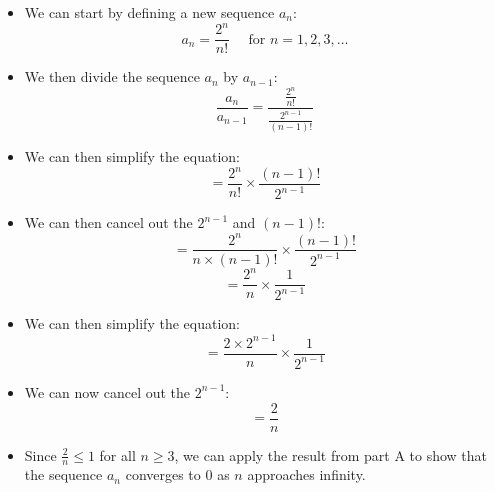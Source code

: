 \documentclass[12pt]{report}
\begin{document}
\begin{enumerate}[leftmargin=\labelsep]
\begin{enumerate}
\begin{tcolorbox}
\begin{itemize}[label={}]
                        \item We can start by defining a new sequence $a_n$:
                        \begin{equation*}
                            a_n = \frac{2^n}{n!} \quad \text{ for } n=1,2,3,\dots
                        \end{equation*}
                        \item We then divide the sequence $a_n$ by $a_{n-1}$:
                        \begin{equation*} \frac{a_n}{a_{n-1}} = \frac{\frac{2^n}{n!}}{\frac{2^{n-1}}{(n-1)!}}
                        \end{equation*}
                        \item We can then simplify the equation:
                        \begin{equation*}
                           = \frac{2^n}{n!} \times \frac{(n-1)!}{2^{n-1}}
                        \end{equation*}
                        \item We can then cancel out the $2^{n-1}$ and $(n-1)!$:
                        \begin{equation*}
                            = \frac{2^n}{n \times (n-1)!} \times \frac{(n-1)!}{2^{n-1}}
                        \end{equation*}
                        \begin{equation*}
                            =\frac{2^n}{n} \times \frac{1}{2^{n-1}}
                        \end{equation*}
                        \item We can then simplify the equation:
                        \begin{equation*}
                            =\frac{2 \times 2^{n-1}}{n} \times \frac{1}{2^{n-1}}
                        \end{equation*}
                        \item We can now cancel out the $2^{n-1}$:
                        \begin{equation*}
                            =\frac{2}{n}
                        \end{equation*}
                        \item Since $\frac{2}{n} \leq 1$ for all $n \geq 3$, we can apply the result from part A to show that the sequence $a_n$ converges to 0 as $n$ approaches infinity.
                    \end{itemize}

\end{tcolorbox}
\end{enumerate}
\end{enumerate}
\end{document}
